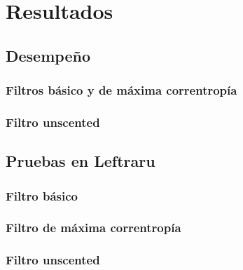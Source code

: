 \chapter{Resultados}
\section{Desempe\~no}
\subsection{Filtros b\'asico y de m\'axima correntrop\'ia}
\subsection{Filtro unscented}
\section{Pruebas en Leftraru}
\subsection{Filtro b\'asico}
\subsection{Filtro de m\'axima correntrop\'ia}
\subsection{Filtro unscented}
\label{ch:resultados}